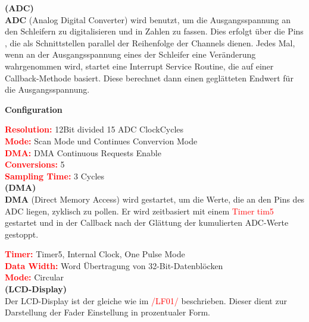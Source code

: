 \textbf{(ADC)}\\

\textbf{ADC} (Analog Digital Converter) wird benutzt, um die Ausgangsspannung an den Schleifern zu digitalisieren und in Zahlen zu fassen. Dies erfolgt über die Pins , die als Schnittstellen parallel der Reihenfolge der Channels  dienen. Jedes Mal, wenn an der Ausgangsspannung eines der Schleifer eine Veränderung wahrgenommen wird, startet eine Interrupt Service Routine, die auf einer Callback-Methode basiert. Diese berechnet dann einen geglätteten Endwert für die Ausgangsspannung. 

\textbf{Configuration}

\textbf{\textcolor{red}{Resolution:}} 12Bit divided 15 ADC ClockCycles \\
\textbf{\textcolor{red}{Mode:}} Scan Mode und Continues Convervion Mode \\
\textbf{\textcolor{red}{DMA:}} DMA Continuous Requests Enable \\
\textbf{\textcolor{red}{Conversions:}} 5 \\
\textbf{\textcolor{red}{Sampling Time:}} 3 Cycles  
\\

\textbf{(DMA)}\\

\textbf{DMA} (Direct Memory Access) wird gestartet, um die Werte, die an den Pins des ADC liegen, zyklisch zu pollen. Er wird zeitbasiert mit einem \textcolor{red}{Timer tim5} gestartet und in der Callback nach der Glättung der kumulierten ADC-Werte gestoppt.

\textbf{\textcolor{red}{Timer:}} Timer5, Internal Clock, One Pulse Mode \\
\textbf{\textcolor{red}{Data Width:}} Word Übertragung von 32-Bit-Datenblöcken \\
\textbf{\textcolor{red}{Mode:}} Circular \\

\textbf{(LCD-Display)}\\

Der LCD-Display ist der gleiche wie im \textcolor{red}{/LF01/} beschrieben. Dieser dient zur Darstellung der Fader Einstellung in prozentualer Form.

\newpage

